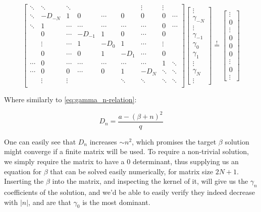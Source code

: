\begin{equation}
\begin{bmatrix}
\ddots & \ddots & \ddots & & & & \vdots & \vdots & \\
\ddots & -D_{-N} & 1 & 0 & \cdots & 0 & 0 & 0 & \cdots \\
\ddots & 1 & \cdots & \cdots & \cdots & \cdots & \cdots & 0 & \cdots \\
& 0 & \cdots & -D_{-1} & 1 & 0 & \cdots & 0 & \\
& \vdots & \cdots & 1 & -D_0 & 1 & \cdots & \vdots & \\
& 0 & \cdots & 0 & 1 & -D_{1} & \cdots & 0 & \\
\cdots & 0 & \cdots & \cdots & \cdots & \cdots & \cdots & 1 & \ddots \\
\cdots & 0 & 0 & \cdots & 0 & 1 & -D_{N} & \ddots & \ddots \\
& \vdots & \vdots & & & \ddots & \ddots & \ddots & \ddots \\
\end{bmatrix}
\begin{bmatrix}
\vdots \\
\gamma_{-N} \\
\vdots \\
\gamma_{-1} \\
\gamma_0 \\
\gamma_{1} \\
\vdots \\
\gamma_{N} \\
\vdots
\end{bmatrix}
\overset{!}{=}
\begin{bmatrix}
\vdots \\
0 \\
\vdots \\
0 \\
0 \\
0 \\
\vdots \\
0 \\
\vdots
\end{bmatrix}
\end{equation}

Where similarly to \ref{eq:gamma_n-relation}:

$$D_n = \frac{a - \left(\beta + n\right)^2}{q}$$

One can easily see that $D_n$ increases $\sim n^2$, which promises the target $\beta$ solution might converge if a finite matrix will be used. To require a non-trivial solution, we simply require the matrix to have a $0$ determinant, thus supplying us an equation for $\beta$ that can be solved easily numerically, for matrix size $2N+1$. Inserting the $\beta$ into the matrix, and inspecting the kernel of it, will give us the $\gamma_n$ coefficients of the solution, and we'd be able to easily verify they indeed decrease with $|n|$, and are that $\gamma_0$ is the most dominant.

